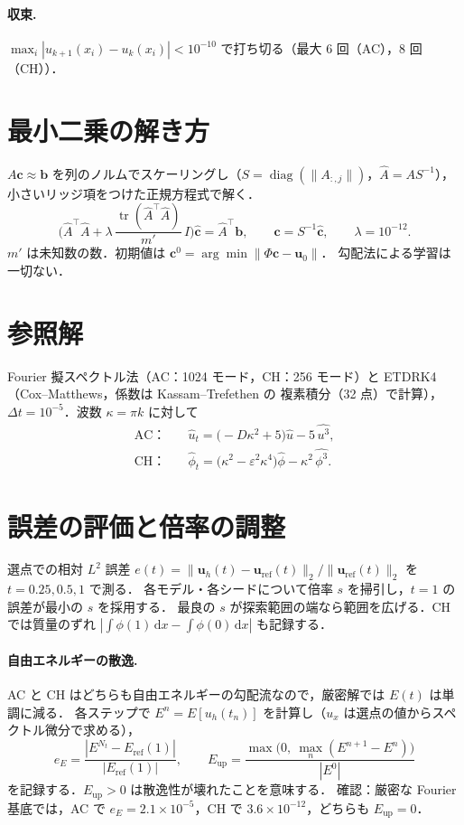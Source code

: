 \documentclass[uplatex,dvipdfmx,a4paper,11pt]{jsarticle}
\newcommand{\dd}{\mathrm{d}}
\begin{document}
\paragraph{収束.}
$\max_i|u_{k+1}(x_i)-u_k(x_i)|<10^{-10}$ で打ち切る（最大 6 回（AC），8 回（CH））．

\section{最小二乗の解き方}
$A\bm c\approx\bm b$ を列のノルムでスケーリングし（$S=\operatorname{diag}(\|A_{:,j}\|)$，$\hat A=AS^{-1}$），
小さいリッジ項をつけた正規方程式で解く．
\begin{equation}
  \Big(\hat A^{\top}\hat A+\lambda\,\frac{\operatorname{tr}(\hat A^{\top}\hat A)}{m'}\,I\Big)\hat{\bm c}=\hat A^{\top}\bm b,\qquad
  \bm c=S^{-1}\hat{\bm c},\qquad \lambda=10^{-12}.
\end{equation}
$m'$ は未知数の数．初期値は $\bm c^{0}=\arg\min\|\Phi\bm c-\bm u_0\|$．
勾配法による学習は一切ない．

\section{参照解}
Fourier 擬スペクトル法（AC：1024 モード，CH：256 モード）と ETDRK4（Cox--Matthews，係数は Kassam--Trefethen の
複素積分（32 点）で計算），$\Delta t=10^{-5}$．波数 $\kappa=\pi k$ に対して
\begin{align}
  \text{AC：}&\quad \hat u_t = \big(-D\kappa^2+5\big)\hat u - 5\,\widehat{u^3},\\
  \text{CH：}&\quad \hat\phi_t = \big(\kappa^2-\varepsilon^2\kappa^4\big)\hat\phi - \kappa^2\,\widehat{\phi^3}.
\end{align}

\section{誤差の評価と倍率の調整}
選点での相対 $L^2$ 誤差 $e(t)=\|\bm u_h(t)-\bm u_{\mathrm{ref}}(t)\|_2/\|\bm u_{\mathrm{ref}}(t)\|_2$
を $t=0.25,0.5,1$ で測る．
各モデル・各シードについて倍率 $s$ を掃引し，$t=1$ の誤差が最小の $s$ を採用する．
最良の $s$ が探索範囲の端なら範囲を広げる．CH では質量のずれ $|\int\phi(1)\,\dd x-\int\phi(0)\,\dd x|$ も記録する．

\paragraph{自由エネルギーの散逸.}
AC と CH はどちらも自由エネルギーの勾配流なので，厳密解では $E(t)$ は単調に減る．
各ステップで $E^{n}=E[u_h(t_n)]$ を計算し（$u_x$ は選点の値からスペクトル微分で求める），
\begin{equation}
  e_E=\frac{|E^{N_t}-E_{\mathrm{ref}}(1)|}{|E_{\mathrm{ref}}(1)|},\qquad
  E_{\mathrm{up}}=\frac{\max\big(0,\ \max_n(E^{n+1}-E^{n})\big)}{|E^{0}|}
\end{equation}
を記録する．$E_{\mathrm{up}}>0$ は散逸性が壊れたことを意味する．
確認：厳密な Fourier 基底では，AC で $e_E=2.1\times10^{-5}$，CH で $3.6\times10^{-12}$，どちらも $E_{\mathrm{up}}=0$．
\end{document}
